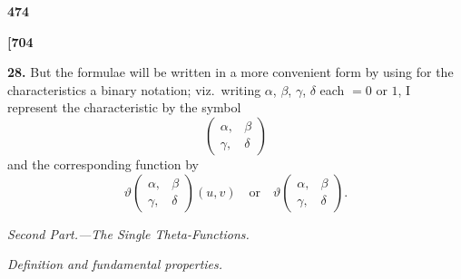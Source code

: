 \documentclass[12pt,a4paper]{article}
\theoremstyle{definition}
\begin{document}
\vspace{1em}

\begin{center}
\textbf{474}
\end{center}

\vspace{0.5em}

\noindent\textbf{[704}

\vspace{0.5em}

\noindent\textbf{28.}\quad
But the formulae will be written in a more convenient form by using for the characteristics a binary notation; viz.\ writing $\alpha$, $\beta$, $\gamma$, $\delta$ each $= 0$ or $1$, I represent the characteristic by the symbol
\[
\begin{pmatrix} \alpha, & \beta \\ \gamma, & \delta \end{pmatrix}
\]
and the corresponding function by
\[
\vartheta\begin{pmatrix} \alpha, & \beta \\ \gamma, & \delta \end{pmatrix}(u, v)\quad \text{or}\quad \vartheta\begin{pmatrix} \alpha, & \beta \\ \gamma, & \delta \end{pmatrix}.
\]

\vspace{1em}

\begin{center}
\textit{Second Part.---The Single Theta-Functions.}
\end{center}

\vspace{0.5em}

\begin{center}
\textit{Definition and fundamental properties.}
\end{center}

\vspace{0.5em}
\end{document}
